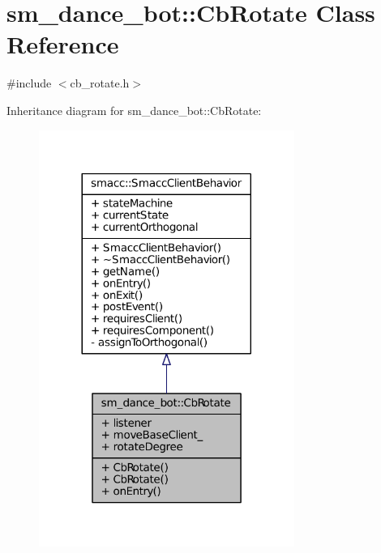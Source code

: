 \hypertarget{classsm__dance__bot_1_1CbRotate}{}\section{sm\+\_\+dance\+\_\+bot\+:\+:Cb\+Rotate Class Reference}
\label{classsm__dance__bot_1_1CbRotate}


{\ttfamily \#include $<$cb\+\_\+rotate.\+h$>$}



Inheritance diagram for sm\+\_\+dance\+\_\+bot\+:\+:Cb\+Rotate\+:
\nopagebreak
\begin{figure}[H]
\begin{center}
\leavevmode
\includegraphics[width=236pt]{classsm__dance__bot_1_1CbRotate__inherit__graph}
\end{center}
\end{figure}


